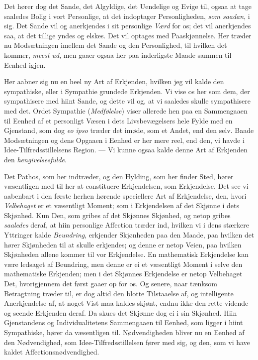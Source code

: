 \documentclass[12pt,a4paper]{book}
\newcommand{\apage}[1]{\marginnote{\footnotesize\textit{[#1]}}}
\begin{document}
Det hører dog det Sande, det Algyldige, det Uendelige og Evige til, ogsaa at
tage saaledes Bolig i vort Personlige, at det indoptager Personligheden, \emph{som
saadan}, i sig. Det Sande vil og anerkjendes i sit personlige \emph{Værd} for os; det
vil anerkjendes saa, at det tillige yndes og elskes. Det vil optages med
Paaskjønnelse. Her træder nu Modsætningen imellem det Sande og den
Personlighed, til hvilken det kommer, \emph{meest ud}, men gaaer ogsaa her paa
inderligste Maade sammen til Eenhed igjen.

Her aabner sig nu en heel ny Art af Erkjenden, hvilken \apage{108} jeg vil kalde den
sympathiske, eller i Sympathie grundede Erkjenden. Vi vise os her som dem, der
sympathisere med hiint Sande, og dette vil og, at vi saaledes skulle
sympathisere med det. Ordet Sympathie (\emph{Medfølelse}) viser allerede hen paa en
Sammengaaen til Eenhed af et personligt Væsen i dets Livsbevægelsers hele
Fylde med en Gjenstand, som dog \textit{eo ipso} træder det imøde, som et
Andet, end den selv. Baade Modsætningen og dens Opgaaen i Eenhed er her mere
reel, end den, vi havde i Idee-Tilfredsstillelsens Region. --- Vi kunne ogsaa
kalde denne Art af Erkjenden den \emph{hengivelsesfulde}.

Det Pathos, som her indtræder, og den Hylding, som her finder Sted, hører
væsentligen med til her at constituere Erkjendelsen, som Erkjendelse. Det see
vi aabenbart i den første herhen hørende speciellere Art af Erkjendelse, den,
hvori \emph{Velbehaget} er et væsentligt Moment; som i Erkjendelsen af det Skjønne i
dets Skjønhed. Kun Den, som gribes af det Skjønnes Skjønhed, og netop gribes
\emph{saaledes} deraf, at hiin personlige Affection træder ind, hvilken vi i dens
stærkere Yttringer kalde \emph{Beundring}, erkjender Skjønheden paa den Maade, paa
hvilken det hører Skjønheden til at skulle erkjendes; og denne er netop Veien,
paa hvilken Skjønheden allene kommer til vor Erkjendelse. En mathematisk
Erkjendelse kan være ledsaget af Beundring, men denne er ei et væsentligt
Moment i selve den mathematiske Erkjenden; men i det Skjønnes Erkjendelse er
netop Velbehaget Det, hvorigjennem det først gaaer op for os. Og senere, naar
tænksom Betragtning træder til, er dog altid den blotte Tilstaaelse af, og
intelligente Anerkjendelse af, at noget Vist maa kaldes skjønt, endnu ikke den
rette vidende og seende Erkjenden deraf. Da skues det Skjønne dog ei i sin
Skjønhed. Hiin Gjenstandens og Individualitetens Sammengaaen til Eenhed, som
ligger i hiint Sympathiske, hører da væsentligen til. Nødvendigheden bliver nu
\apage{109} en Eenhed af den Nødvendighed, som Idee-Tilfredsstillelsen fører med sig, og
den, som vi have kaldet Affectionsnødvendighed.
\end{document}
